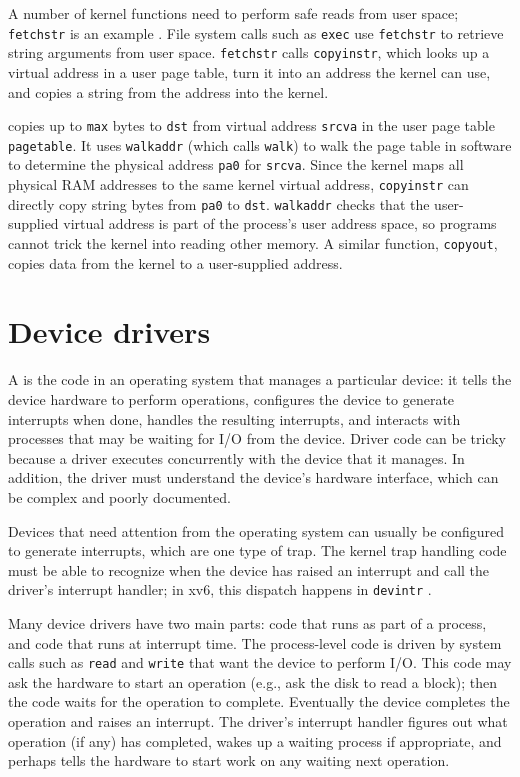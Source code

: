 A number of kernel functions need to perform safe reads from user space;
{\tt fetchstr} is an example .
File system calls such as
{\tt exec} use {\tt fetchstr} to retrieve string arguments from user
space.
\lstinline{fetchstr} calls \lstinline{copyinstr},
which looks up a virtual address in a user page
table, turn it into an address the kernel can use,
and copies a string from the address into the kernel.

 copies up to \lstinline{max} bytes to
\lstinline{dst} from virtual address \lstinline{srcva} in the user page
table \lstinline{pagetable}.  It uses {\tt walkaddr}
(which calls {\tt walk}) to walk the page table in software to
determine the physical address \lstinline{pa0} for \lstinline{srcva}.
Since the kernel maps all physical RAM addresses to the same
kernel virtual address,
{\tt copyinstr} can directly copy string bytes from {\tt pa0} to {\tt dst}.
{\tt walkaddr} 
checks that the user-supplied virtual address is part of
the process's user address space, so programs
cannot trick the kernel into reading other memory.
A similar function, {\tt copyout}, copies data from the
kernel to a user-supplied address.

\section{Device drivers}

A
is the code in an operating system that manages a particular device:
it tells the device hardware to perform operations,
configures the device to generate interrupts when done,
handles the resulting interrupts,
and interacts with processes that may be waiting
for I/O from the device.
Driver code can be tricky
because a driver executes concurrently with the device that it manages.  In
addition, the driver must understand the device's hardware interface,
which can be complex and poorly documented.

Devices that need attention from the operating system can usually be
configured to generate interrupts, which are one type of trap.
The kernel trap handling code must be able to recognize when the device
has raised an interrupt and call the driver's interrupt handler;
in xv6, this dispatch happens in {\tt devintr} .

Many device drivers have two main parts: code that runs as part of a
process, and code that runs at interrupt time. The process-level code
is driven by system calls such as {\tt read} and {\tt write} that want
the device to perform I/O. This code may ask the hardware to start an
operation (e.g., ask the disk to read a block); then the code waits for
the operation to complete. Eventually the device completes the
operation and raises an interrupt. The driver's interrupt handler
figures out what operation (if any) has completed, wakes up a waiting
process if appropriate, and perhaps tells the hardware to start work
on any waiting next operation.

